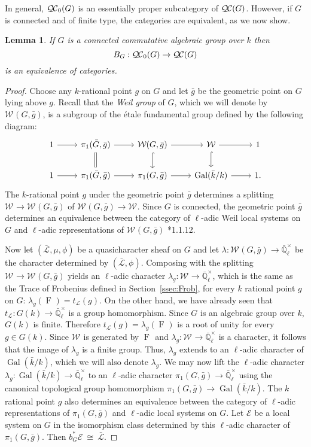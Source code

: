 \documentclass[CM,Submssn,SecEq]{degruyter-crelle} %
\theoremstyle{plain}
\newtheorem{lemma}[theorem]{Lemma}
\theoremstyle{definition}
\theoremstyle{remark}
\newcommand{\EE}{\mathbb{\bar Q}_\ell}
\newcommand{\bFq}{\bar{k}}
\newcommand{\Fq}{k}
\newcommand{\EEx}{\EE^\times}
\newcommand{\Weil}[1]{\mathcal{W}_{#1}}
\DeclareMathOperator{\Gal}{Gal}
\newcommand{\Frob}[1]{\operatorname{F}_{#1}}
\newcommand{\iso}{{\ \cong\ }}
\newcommand{\trFrob}[1]{t_{#1}}
\newcommand{\qcs}[1]{{\mathcal{#1}}}
\newcommand{\gqcs}[1]{{\mathcal{\bar #1}}}
\newcommand{\QC}{{\mathcal{Q\hskip-0.8pt C}}}
\newcommand{\bQC}{{\QC_0}}
\newcommand{\bg}{\bar{g}}
\newcommand{\bG}{\bar{G}}
\begin{document}
In general, $\bQC(G)$ is an essentially
proper subcategory of $\QC(G)$. 
However, if $G$ is connected and of finite type, the categories are equivalent, as we now show.

\begin{lemma}\label{lem:bounded_connected}
If $G$ is a connected commutative algebraic group over $\Fq$ then 
\[
B_G : \bQC(G) \to \QC(G)
\]
 is an equivalence of categories.
\end{lemma}

\begin{proof}
Choose any $\Fq$-rational point $g$ on $G$ and let $\bg$ be the geometric point on $G$ lying above $g$.
Recall that the \emph{Weil group} of $G$, which we will denote by $\Weil{}(G,\bg)$, is a subgroup of the \'etale
fundamental group defined by the following diagram:
\[
 \begin{tikzcd}
 1 \rar & \ar[equal]{d} \pi_1(\bG, \bg) \rar & \Weil{}(G,\bg) \rar \dar[hook] & \Weil{} \rar \dar[hook] & 1 \\
 1 \rar &  \pi_1(\bG, \bg) \rar & \pi_1(G,\bg) \rar & \Gal(\bFq/\Fq) \rar & 1.
 \end{tikzcd}
\]
The $\Fq$-rational point $g$ under the geometric point $\bg$ determines a splitting
$\Weil{}\to \Weil{}(G,\bg)$ of $\Weil{}(G,\bg)\to \Weil{}$.
%
  Since $G$ is connected, the geometric point $\bg$ determines
  an equivalence between the category of $\ell$-adic Weil local systems on $G$ and
  $\ell$-adic representations of $\Weil{}(G,\bg)$ \cite{deligne:80a}*{1.1.12}.
  
  Now let $(\gqcs{L},\mu,\phi)$ be a quasicharacter sheaf on $G$
  and let $\lambda : \Weil{}(G, \bg) \to \EEx$ be the character determined by $(\gqcs{L},\phi)$.
  Composing with the splitting $\Weil{} \to \Weil{}(G,\bg)$ yields an $\ell$-adic character
  $\lambda_g : \Weil{} \to \EEx$, which is the same as the Trace of Frobenius defined in Section~\ref{ssec:Frob}, for every $\Fq$ rational point $g$ on $G$:
  $
  \lambda_g(\Frob{}) =  \trFrob{\qcs{L}}(g).
  $
%
  On the other hand, we have already seen that $\trFrob{\qcs{L}} : G(\Fq) \to \EEx$
  is a group homomorphism. 
  Since $G$ is an algebraic group over $\Fq$, $G(\Fq)$ is finite.
  Therefore $\trFrob{\qcs{L}}(g) = \lambda_g(\Frob{})$ is a root of unity
  for every $g\in G(\Fq)$.  Since $\Weil{}$ is generated by
  $\Frob{}$ and $\lambda_g : \Weil{} \to \EEx$ is
  a character, it follows that the image of $\lambda_g$ is a finite group.
  Thus, $\lambda_g$ extends to an $\ell$-adic character of $\Gal(\bFq/\Fq)$,
  which we will also denote $\lambda_g$.
%
  We may now lift the $\ell$-adic character $\lambda_g : \Gal(\bFq/\Fq) \to \EEx$
  to an $\ell$-adic character $\pi_1(G,\bg) \to \EEx$ using the canonical topological group homomorphism
  $\pi_1(G,\bg) \to \Gal(\bFq/\Fq)$. 
  The $\Fq$ rational point $g$ also
  determines an equivalence between the category of $\ell$-adic
  representations of $\pi_1(G,\bg)$ and $\ell$-adic local systems on $G$. Let
  $\qcs{E}$ be a local system on $G$ in the isomorphism class
  determined by this $\ell$-adic character of $\pi_1(G,\bg)$.
  Then $b_G^*\qcs{E} \iso \gqcs{L}$.
  

\end{proof}
\end{document}
